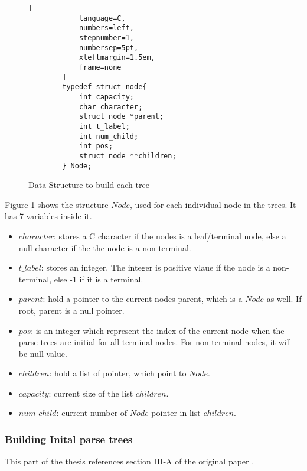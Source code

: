 \begin{figure}[H]

    \begin{tcolorbox}[title=Node Structure to build each tree, colback=white, colframe=black]

        \begin{lstlisting}[
            language=C,
            numbers=left,
            stepnumber=1,
            numbersep=5pt,
            xleftmargin=1.5em,
            frame=none
        ]
        typedef struct node{
            int capacity;
            char character;
            struct node *parent;
            int t_label;
            int num_child;
            int pos;
            struct node **children;
        } Node;
        \end{lstlisting}
    \end{tcolorbox}

\caption{Data Structure to build each tree}
\label{fig:Data_Structures2}
\end{figure}


Figure \ref{fig:Data_Structures2} shows the structure $Node$, used for each individual node in the trees. It has 7 variables inside it. 
\begin{itemize}
    \item $character$: stores a C character if the nodes is a leaf/terminal node, else a null character if the the node is a non-terminal.
    \item  $t\_label$: stores an integer. The integer is positive vlaue if the node is a non-terminal, else -1 if it is a terminal.
    \item $parent$: hold a pointer to the current nodes parent, which is a $Node$ as well. If root, parent is a null pointer.
    \item $pos$: is an integer which represent the index of the current node when the parse trees are initial for all terminal nodes. For non-terminal nodes, it will be null value.
    \item $children$: hold a list of pointer, which point to $Node$.
    \item $capacity$: current size of the list $children$. 
    \item $num\_child$: current number of $Node$ pointer in list $children$.
\end{itemize}

\subsubsection{Building Inital parse trees}

This part of the thesis references section III-A of the original paper \cite{kulkarniLearningHighlyRecursive2021}.